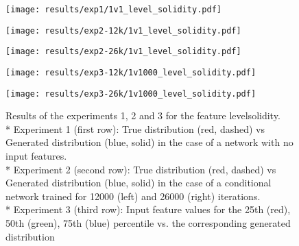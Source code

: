 \begin{figure}[h!]
	\begin{minipage}{0.5\linewidth}
		\texttt{[image: results/exp1/1v1\_level\_solidity.pdf]}
	\end{minipage}
	
	\begin{minipage}{0.5\linewidth}
		\texttt{[image: results/exp2-12k/1v1\_level\_solidity.pdf]}
	\end{minipage}
	\begin{minipage}{0.5\linewidth}
		\texttt{[image: results/exp2-26k/1v1\_level\_solidity.pdf]}
	\end{minipage}
	
	\begin{minipage}{0.5\linewidth}
		\texttt{[image: results/exp3-12k/1v1000\_level\_solidity.pdf]}
	\end{minipage}
	\begin{minipage}{0.5\linewidth}
		\texttt{[image: results/exp3-26k/1v1000\_level\_solidity.pdf]}
	\end{minipage}
	\caption[ Results: Input feature level\textunderscore solidity]{ Results of the experiments 1, 2 and 3 for the feature level\textunderscore solidity. \\* Experiment 1 (first row): True distribution (red, dashed) vs Generated distribution (blue, solid) in the case of a network with no input features. \\* Experiment 2 (second row): True distribution (red, dashed) vs Generated distribution (blue, solid) in the case of a conditional network trained for 12000 (left) and 26000 (right) iterations. \\* Experiment 3 (third row): Input feature values for the 25th (red), 50th (green), 75th (blue) percentile vs. the corresponding generated distribution}
	\label{fig:results_level_solidity}
\end{figure}
